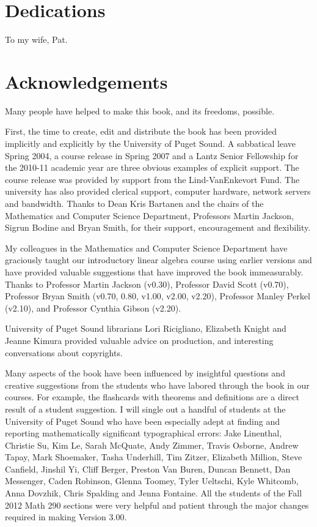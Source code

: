 \documentclass{ximera}
\begin{document}
\section{Dedications}

To my wife, Pat.

\section{Acknowledgements}

Many people have helped to make this book, and its freedoms, possible.

First, the time to create, edit and distribute the book has been provided implicitly and explicitly by the University of Puget Sound. A sabbatical leave Spring 2004, a course release in Spring 2007 and a Lantz Senior Fellowship for the 2010-11 academic year are three obvious examples of explicit support. The course release was provided by support from the Lind-VanEnkevort Fund. The university has also provided clerical support, computer hardware, network servers and bandwidth. Thanks to Dean Kris Bartanen and the chairs of the Mathematics and Computer Science Department, Professors Martin Jackson, Sigrun Bodine and Bryan Smith, for their support, encouragement and flexibility.

My colleagues in the Mathematics and Computer Science Department have graciously taught our introductory linear algebra course using earlier versions and have provided valuable suggestions that have improved the book immeasurably. Thanks to Professor Martin Jackson (v0.30), Professor David Scott (v0.70), Professor Bryan Smith (v0.70, 0.80, v1.00, v2.00, v2.20), Professor Manley Perkel (v2.10), and Professor Cynthia Gibson (v2.20).

University of Puget Sound librarians Lori Ricigliano, Elizabeth Knight and Jeanne Kimura provided valuable advice on production, and interesting conversations about copyrights.

Many aspects of the book have been influenced by insightful questions and creative suggestions from the students who have labored through the book in our courses. For example, the flashcards with theorems and definitions are a direct result of a student suggestion. I will single out a handful of students at the University of Puget Sound who have been especially adept at finding and reporting mathematically significant typographical errors: Jake Linenthal, Christie Su, Kim Le, Sarah McQuate, Andy Zimmer, Travis Osborne, Andrew Tapay, Mark Shoemaker, Tasha Underhill, Tim Zitzer, Elizabeth Million, Steve Canfield, Jinshil Yi, Cliff Berger, Preston Van Buren, Duncan Bennett, Dan Messenger, Caden Robinson, Glenna Toomey, Tyler Ueltschi, Kyle Whitcomb, Anna Dovzhik, Chris Spalding and Jenna Fontaine. All the students of the Fall 2012 Math 290 sections were very helpful and patient through the major changes required in making Version 3.00.
\end{document}
